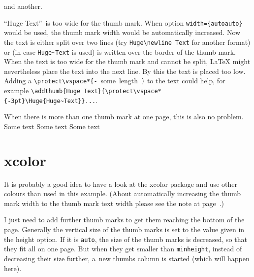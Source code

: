 \documentclass[a4paper,twoside,british]{article}[2025/01/22]%
\begin{document}

and another.\bigskip


\textquotedblleft {\Huge{Huge Text}}\textquotedblright\ is too wide for the thumb mark. When option
\texttt{width=\{autoauto\}} would be used, the thumb mark width would be automatically increased.
Now the text is either split over two lines (try \verb|Huge\newline Text| for another format)
or (in case \verb|Huge~Text| is used) is written over the border of the thumb mark. When the text is
too wide for the thumb mark and cannot be split, \LaTeX{} might nevertheless place the text into the
next line. By this the text is placed too low. Adding a
\hbox{\verb|\protect\vspace*{-| some length \verb|}|} to the text could help, for example\newline
\verb|\addthumb{Huge Text}{\protect\vspace*{-3pt}\Huge{Huge~Text}}...|.\label{HugeText}\bigskip


\noindent When there is more than one thumb mark at one page, this is also no problem.\newpage
Some text\newpage
Some text\newpage
Some text\newpage

\section{xcolor}

It is probably a good idea to have a look at the \textsf{xcolor} package and use other colours than used
in this example.\newline
(About automatically increasing the thumb mark width to the thumb mark text width please see the note
at page~\pageref{HugeText}.)
\newpage


I just need to add further thumb marks to get them reaching the bottom of the page.\newline
Generally the vertical size of the thumb marks is set to the value given in the height option.
If it is \texttt{auto}, the size of the thumb marks is decreased, so that they fit all on one page.
But when they get smaller than \texttt{minheight}, instead of decreasing their size further,
a~new thumbs column is started (which will happen here).
\newpage
\end{document}
